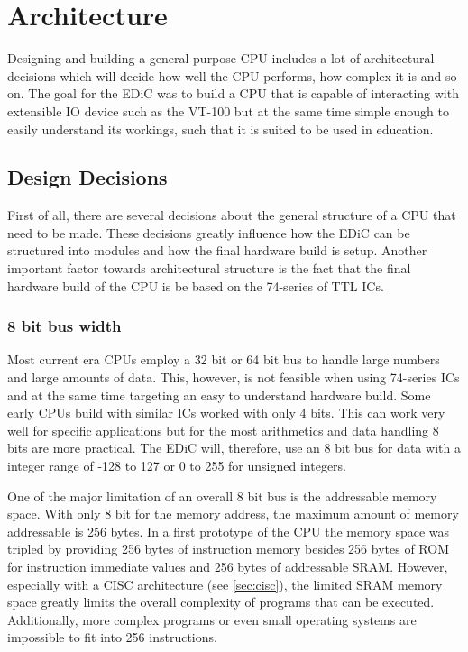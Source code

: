 \chapter{Architecture}\label{cha:architecture}
Designing and building a general purpose \gls{CPU} includes a lot of architectural decisions which will decide how well the \gls{CPU} performs, how complex it is and so on.
The goal for the \gls{EDiC} was to build a \gls{CPU} that is capable of interacting with extensible \gls{IO} device such as the VT-100 but at the same time simple enough to easily understand its workings, such that it is suited to be used in education.

\section{Design Decisions}
First of all, there are several decisions about the general structure of a \gls{CPU} that need to be made.
These decisions greatly influence how the \gls{EDiC} can be structured into modules and how the final hardware build is setup.
Another important factor towards architectural structure is the fact that the final hardware build of the \gls{CPU} is be based on the 74-series of \gls{TTL} \glspl{IC}.

\subsection{8 bit bus width}
Most current era \glspl{CPU} employ a 32 bit or 64 bit bus to handle large numbers and large amounts of data.
This, however, is not feasible when using 74-series \glspl{IC} and at the same time targeting an easy to understand hardware build.
Some early \glspl{CPU} build with similar \glspl{IC} worked with only 4 bits.
This can work very well for specific applications but for the most arithmetics and data handling 8 bits are more practical.
The \gls{EDiC} will, therefore, use an 8 bit bus for data with a integer range of -128 to 127 or 0 to 255 for unsigned integers.

One of the major limitation of an overall 8 bit bus is the addressable memory space.
With only 8 bit for the memory address, the maximum amount of memory addressable is 256 bytes.
In a first prototype of the \gls{CPU} the memory space was tripled by providing 256 bytes of instruction memory besides 256 bytes of \gls{ROM} for instruction immediate values and 256 bytes of addressable \gls{SRAM}.
However, especially with a \gls{CISC} architecture (see \cref{sec:cisc}), the limited \gls{SRAM} memory space greatly limits the overall complexity of programs that can be executed.
Additionally, more complex programs or even small operating systems are impossible to fit into 256 instructions.


